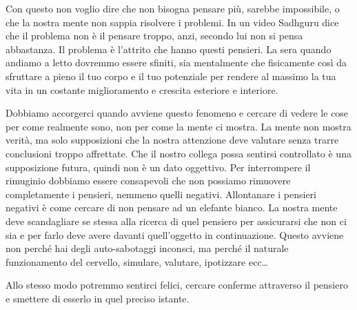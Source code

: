\documentclass[12pt]{book} %
\begin{document}
Con questo non voglio dire che non bisogna pensare più, sarebbe impossibile, o che la nostra mente non sappia risolvere
i problemi. In un video Sadhguru dice che il problema non è il pensare troppo, anzi, secondo lui non si pensa abbastanza. Il problema è l'attrito che hanno questi pensieri. La sera quando andiamo a letto dovremmo essere sfiniti, sia mentalmente che fisicamente così da sfruttare a pieno il tuo corpo e il tuo potenziale per rendere al massimo la tua vita in un costante miglioramento e crescita esteriore e interiore.

Dobbiamo accorgerci quando avviene questo fenomeno e cercare di vedere le cose per come realmente
sono, non per come la mente ci mostra. La mente non mostra verità, ma solo supposizioni che la nostra attenzione deve
valutare senza trarre conclusioni troppo affrettate. Che il nostro collega possa sentirsi controllato è una
supposizione futura, quindi non è un dato oggettivo. Per interrompere il rimuginio dobbiamo essere consapevoli che non
possiamo rimuovere completamente i pensieri, nemmeno quelli negativi. Allontanare i pensieri negativi è come cercare di
non pensare ad un elefante bianco. La nostra mente deve scandagliare se stessa alla ricerca di
quel pensiero per assicurarsi che non ci sia e per farlo deve avere davanti quell'oggetto in continuazione. Questo
avviene non perché hai degli auto-sabotaggi inconsci, ma perché il naturale funzionamento del cervello, simulare,
valutare, ipotizzare ecc…

Allo stesso modo potremmo sentirci felici, cercare conferme attraverso il pensiero e smettere di esserlo in quel preciso
istante. 
\end{document}
